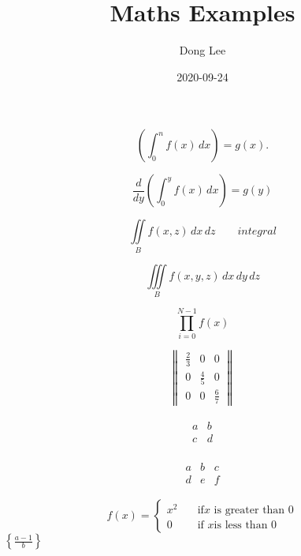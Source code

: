 \documentclass[a4paper,12pt]{article}
\begin{document}
\color{blue}
\title{Maths Examples}
\author{Dong Lee}
\date{2020-09-24}

\maketitle

\begin{center}

\color{green}
\[
\left(\int_{0}^{n}f(x)\,dx\right)=g(x).   %
\]

\color{red}
\[
\frac{d}{dy}\left(\int_{0}^{y} f(x)\,dx\right)=g(y)  %
\]


\color{blue}
\[
  \iint\limits_B f(x,z)\,dx\,dz\qquad integral  %
\]

\color{pink}
\[
 \iiint\limits_B f(x,y,z)\,dx\,dy\,dz  
\]

\color{yellow}
\[
  \prod_{i=0}^{N-1} f(x)
\]

\color{brown}

\[
   \begin{Vmatrix}
   \frac{2}{3} &  0 & 0 \\
   0 & \frac{4}{5} &  0 \\
   0 & 0 & \frac{6}{7}
   \end{Vmatrix}
\]

\color{purple}
\[
	\begin{matrix}
	\begin{array}{c|c}
 	a & b \\
 	\hline
 	c & d
	\end{array}
	\end{matrix}
\]

\color{green}
\[
	\begin{matrix}
	\begin{array}{|l|c|r|}
	a & b & c\\
	\hline
	d & e & f
	\end{array}
	\end{matrix}
\]
\color{gray}

\[ f(x)=
	\begin{cases}
		x^2 & \quad \text{if} x \text{ is greater than 0} \\ %
		0 & \quad \text{if }x \text{is less than 0} %
	\end{cases}
\]
\begin{math}
  \left\{\frac{a-1}{b}\right\}
\end{math}


\end{center}
\end{document}
